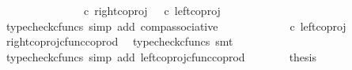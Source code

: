 \begin{isabellebody}
\ \ \ \ \ \ \ \ \ \ {\isacharparenleft}{\kern0pt}{\isasymlangle}{\isasymt}{\isacharcomma}{\kern0pt}{\isasymt}{\isasymrangle}\ {\isasymamalg}\ {\isasymlangle}{\isasymt}{\isacharcomma}{\kern0pt}{\isasymf}{\isasymrangle}\ {\isasymamalg}\ {\isasymlangle}{\isasymf}{\isacharcomma}{\kern0pt}{\isasymt}{\isasymrangle}\ {\isasymcirc}\isactrlsub c\ right{\isacharunderscore}{\kern0pt}coproj\ {\isasymone}\ {\isacharparenleft}{\kern0pt}{\isasymone}{\isasymCoprod}{\isasymone}{\isacharparenright}{\kern0pt}\ {\isacharparenright}{\kern0pt}{\isasymcirc}\isactrlsub c\ left{\isacharunderscore}{\kern0pt}coproj\ {\isasymone}\ {\isasymone}{\isachardoublequoteclose}\isanewline
\ \ \ \ \ \ \isamarkupfalse%
\ {\isacharparenleft}{\kern0pt}typecheck{\isacharunderscore}{\kern0pt}cfuncs{\isacharcomma}{\kern0pt}\ simp\ add{\isacharcolon}{\kern0pt}\ comp{\isacharunderscore}{\kern0pt}associative{}{\isacharparenright}{\kern0pt}\isanewline
\ \ \ \ \isamarkupfalse%
\ \isamarkupfalse%
\ {\isachardoublequoteopen}{\isachardot}{\kern0pt}{\isachardot}{\kern0pt}{\isachardot}{\kern0pt}\ {\isacharequal}{\kern0pt}\ {\isasymlangle}{\isasymt}{\isacharcomma}{\kern0pt}{\isasymf}{\isasymrangle}\ {\isasymamalg}\ {\isasymlangle}{\isasymf}{\isacharcomma}{\kern0pt}{\isasymt}{\isasymrangle}\ {\isasymcirc}\isactrlsub c\ left{\isacharunderscore}{\kern0pt}coproj\ {\isasymone}\ {\isasymone}{\isachardoublequoteclose}\isanewline
\ \ \ \ \ \ \isamarkupfalse%
\ right{\isacharunderscore}{\kern0pt}coproj{\isacharunderscore}{\kern0pt}cfunc{\isacharunderscore}{\kern0pt}coprod\ \isamarkupfalse%
\ {\isacharparenleft}{\kern0pt}typecheck{\isacharunderscore}{\kern0pt}cfuncs{\isacharcomma}{\kern0pt}\ smt{\isacharparenright}{\kern0pt}\isanewline
\ \ \ \ \isamarkupfalse%
\ \isamarkupfalse%
\ {\isachardoublequoteopen}{\isachardot}{\kern0pt}{\isachardot}{\kern0pt}{\isachardot}{\kern0pt}\ {\isacharequal}{\kern0pt}\ {\isasymlangle}{\isasymt}{\isacharcomma}{\kern0pt}{\isasymf}{\isasymrangle}{\isachardoublequoteclose}\isanewline
\ \ \ \ \ \ \isamarkupfalse%
\ {\isacharparenleft}{\kern0pt}typecheck{\isacharunderscore}{\kern0pt}cfuncs{\isacharcomma}{\kern0pt}\ simp\ add{\isacharcolon}{\kern0pt}\ left{\isacharunderscore}{\kern0pt}coproj{\isacharunderscore}{\kern0pt}cfunc{\isacharunderscore}{\kern0pt}coprod{\isacharparenright}{\kern0pt}\isanewline
\ \ \ \ \isamarkupfalse%
\ \isamarkupfalse%
\ {\isacharquery}{\kern0pt}thesis\isanewline
\ \ \ \ \ \ \isamarkupfalse%

\end{isabellebody}

